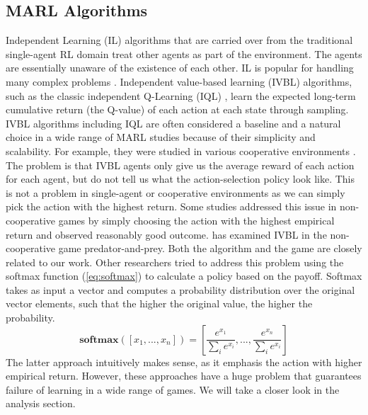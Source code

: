 \documentclass[]{interact}
\theoremstyle{plain}%
\theoremstyle{definition}
\theoremstyle{remark}
\begin{document}
\subsection{MARL Algorithms}
Independent Learning (IL) algorithms that are carried over from the traditional single-agent RL domain treat other agents as part of the environment. The agents are essentially unaware of the existence of each other. IL is popular for handling many complex problems \cite{papoudakis2020benchmarking, gupta2017cooperative, de2020independent, palmer2020independent}. Independent value-based learning (IVBL) algorithms, such as the classic independent Q-Learning (IQL) \cite{tan1993multi}, learn the expected long-term cumulative return (the Q-value) of each action at each state through sampling. IVBL algorithms including IQL are often considered a baseline and a natural choice in a wide range of MARL studies because of their simplicity and scalability. For example, they were studied in various cooperative environments \cite{foerster2017stabilising, omidshafiei2017deep, palmer2017lenient, palmer2018negative}. The problem is that IVBL agents only give us the average reward of each action for each agent, but do not tell us what the action-selection policy look like. This is not a problem in single-agent or cooperative environments as we can simply pick the action with the highest return. Some studies addressed this issue in non-cooperative games by simply choosing the action with the highest empirical return \cite{bjornsson2009cadiaplayer, jiang2018q, kopacz2023evaluating} and observed reasonably good outcome. \cite{kopacz2023evaluating} has examined IVBL in the non-cooperative game predator-and-prey. Both the algorithm and the game are closely related to our work. Other researchers \cite{qu2020distributed} tried to address this problem using the softmax function (\ref{eq:softmax}) to calculate a policy based on the payoff. Softmax takes as input a vector and computes a probability distribution over the original vector elements, such that the higher the original value, the higher the probability.
\begin{equation}
    \textbf{softmax}([x_1, ..., x_n]) = [\frac{e^{x_1}}{\sum_{i}{e^{x_i}}}, ..., \frac{e^{x_n}}{\sum_{i}{e^{x_i}}}]
    \label{eq:softmax}
\end{equation}
The latter approach intuitively makes sense, as it emphasis the action with higher empirical return. However, these approaches have a huge problem that guarantees failure of learning in a wide range of games. We will take a closer look in the analysis section.
\end{document}
